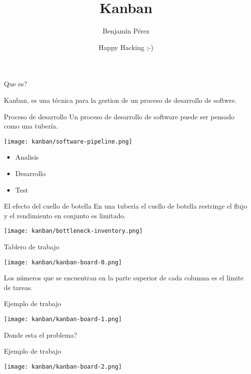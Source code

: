 \documentclass[xcolor=dvipsnames]{beamer}
\title{Kanban}
\author{Benjam\'in P\'erez}
\institute[SCESI]{Sociedad Cient\'ifica de Estudiantes de Sistemas Inform\'atica \\ $\ $ \\ \texttt{[image: images/banner]}}
\date[\today]{Happy Hacking ;-)}
\begin{document}
\frame{\titlepage}

\begin{frame}{Que es?}
  \begin{center}
    Kanban, es una t\'ecnica para la gestion de un proceso de desarrollo de softwre.
  \end{center}
\end{frame}

\begin{frame}{Proceso de desarrollo}
  Un proceso de desarrollo de software puede ser pensado como una tuber\'ia.
  \begin{center}
      \texttt{[image: kanban/software-pipeline.png]}
  \end{center}
  \begin{itemize}
      \item Analisis
      \item Desarrollo
      \item Test
  \end{itemize}
\end{frame}

\begin{frame}{El efecto del cuello de botella}
  En una tuber\'ia el cuello de botella restringe el flujo y el rendimiento en conjunto es limitado.
  \begin{center}
      \texttt{[image: kanban/bottleneck-inventory.png]}
  \end{center}
\end{frame}

\begin{frame}{Tablero de trabajo}
  \begin{center}
      \texttt{[image: kanban/kanban-board-0.png]}
  \end{center}
  Los n\'umeros que se encuentran en la parte superior de cada columna es el l\'imite de tareas.
\end{frame}

\begin{frame}{Ejemplo de trabajo}
  \begin{center}
      \texttt{[image: kanban/kanban-board-1.png]}
  \end{center}
  Donde esta el problema?
\end{frame}

\begin{frame}{Ejemplo de trabajo}
  \begin{center}
      \texttt{[image: kanban/kanban-board-2.png]}
  \end{center}
\end{frame}
\end{document}
